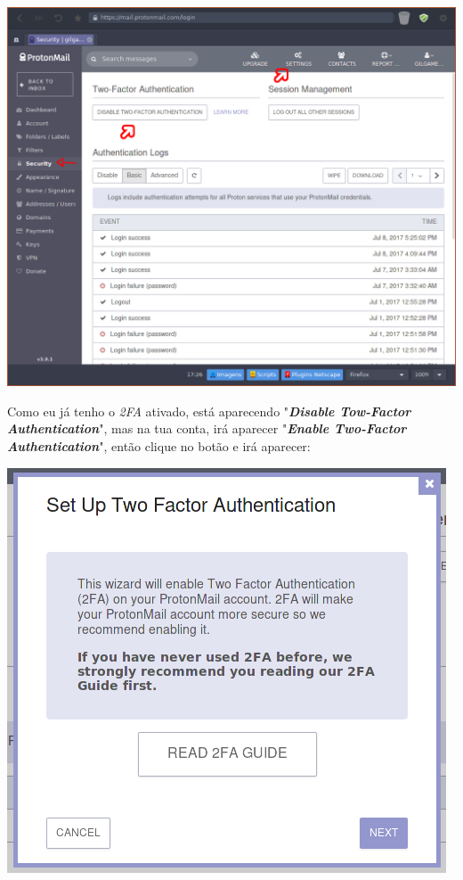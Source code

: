 \documentclass[12pt, letterpaper, Monospace:12]{report}
\begin{document}
	\begin{center}
		\includegraphics[scale=0.53]{proton.png}
	\end{center}

	Como eu já tenho o \textit{2FA} ativado, está aparecendo "\textit{\textbf{Disable Tow-Factor Authentication}}", mas na tua conta, irá aparecer "\textit{\textbf{Enable Two-Factor Authentication}}", então clique no botão e irá aparecer:

	\begin{center}
		\includegraphics[scale=0.55]{proton2.png}
	\end{center}
\end{document}
